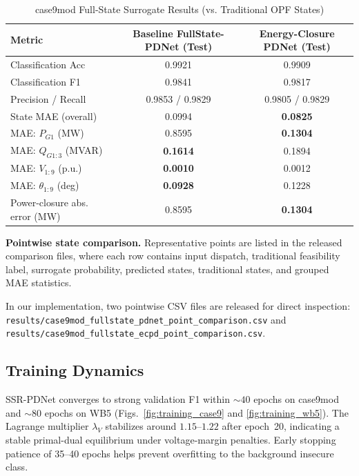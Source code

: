 \documentclass[journal]{IEEEtran}
\begin{document}
\begin{table}[!t]
  \centering
  \caption{case9mod Full-State Surrogate Results (vs. Traditional OPF States)}
  \label{tab:fullstate}
  \begin{tabular}{lcc}
    \toprule
    Metric & Baseline FullState-PDNet (Test) & Energy-Closure PDNet (Test) \\
    \midrule
    Classification Acc & 0.9921 & 0.9909 \\
    Classification F1 & 0.9841 & 0.9817 \\
    Precision / Recall & 0.9853 / 0.9829 & 0.9805 / 0.9829 \\
    State MAE (overall) & 0.0994 & \textbf{0.0825} \\
    MAE: $P_{G1}$ (MW) & 0.8595 & \textbf{0.1304} \\
    MAE: $Q_{G1:3}$ (MVAR) & \textbf{0.1614} & 0.1894 \\
    MAE: $V_{1:9}$ (p.u.) & \textbf{0.0010} & 0.0012 \\
    MAE: $\theta_{1:9}$ (deg) & \textbf{0.0928} & 0.1228 \\
    Power-closure abs. error (MW) & 0.8595 & \textbf{0.1304} \\
    \bottomrule
  \end{tabular}
\end{table}

\textbf{Pointwise state comparison.}
Representative points are listed in the released comparison files,
where each row
contains input dispatch, traditional feasibility label, surrogate probability,
predicted states, traditional states, and grouped MAE statistics.

In our implementation, two pointwise CSV files are released for direct
inspection: \texttt{results/case9mod\_fullstate\_pdnet\_point\_comparison.csv}
and \texttt{results/case9mod\_fullstate\_ecpd\_point\_comparison.csv}.

\subsection{Training Dynamics}

SSR-PDNet converges to strong validation F1 within $\sim 40$ epochs on case9mod
and $\sim 80$ epochs on WB5 (Figs.~\ref{fig:training_case9} and
\ref{fig:training_wb5}). The Lagrange multiplier $\lambda_V$ stabilizes
around $1.15$--$1.22$ after epoch~20, indicating a stable primal-dual
equilibrium under voltage-margin penalties. Early stopping patience of
35--40 epochs helps prevent overfitting to the background insecure class.
\end{document}
